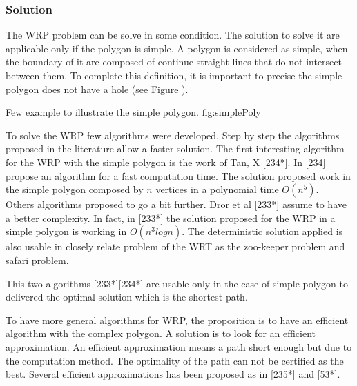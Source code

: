 
 
\subsubsection{Solution} 

The WRP problem can be solve in some condition. The solution to solve it are applicable only if the polygon is simple. A polygon is considered as simple, when the boundary of it are composed of continue straight lines that do not intersect between them. To complete this definition, it is important to precise the simple polygon does not have a hole (see Figure ). 
 \begin{mfigures}[!]
{Few example to illustrate the simple polygon. }{fig:simplePoly} \centering
{}
\hspace{1cm}
\hspace{1cm}
\end{mfigures}	

To solve the WRP few algorithms were developed. Step by step the algorithms proposed in the literature allow a faster solution. The first interesting algorithm for the WRP with the simple polygon is the work  of Tan, X [234*]\cite{}. In [234] propose an algorithm for a fast computation time. The solution proposed work in the simple polygon composed by $n$ vertices in a polynomial time $O(n^5)$. \\
Others algorithms proposed to go a bit further. Dror et al [233*]\cite{} assume to have a better complexity. In fact, in [233*]\cite{} the solution proposed for the WRP in a simple polygon is working in $O(n^3 log n)$.  The deterministic solution applied is also usable in closely relate problem  of the WRT as the zoo-keeper problem and safari problem.

This two algorithms [233*][234*] are usable only in the case of simple polygon to delivered the optimal solution which is the shortest path. 

To have more general algorithms for WRP, the proposition is to have an efficient algorithm with the complex polygon. A solution is to look for an efficient approximation. An efficient approximation means a path short enough but due to the computation method. The optimality of the path can not be certified as the best.
Several efficient approximations has been proposed as in [235*] and [53*]. 

